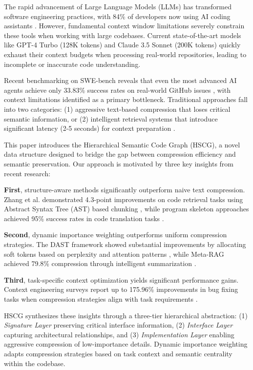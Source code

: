\documentclass[conference]{IEEEtran}
\begin{document}
The rapid advancement of Large Language Models (LLMs) has transformed software engineering practices, with 84\% of developers now using AI coding assistants \cite{stackoverflow2025survey}. However, fundamental context window limitations severely constrain these tools when working with large codebases. Current state-of-the-art models like GPT-4 Turbo (128K tokens) and Claude 3.5 Sonnet (200K tokens) quickly exhaust their context budgets when processing real-world repositories, leading to incomplete or inaccurate code understanding.

Recent benchmarking on SWE-bench reveals that even the most advanced AI agents achieve only 33.83\% success rates on real-world GitHub issues \cite{swebench2024}, with context limitations identified as a primary bottleneck. Traditional approaches fall into two categories: (1) aggressive text-based compression that loses critical semantic information, or (2) intelligent retrieval systems that introduce significant latency (2-5 seconds) for context preparation \cite{cognition2024swebench}.

This paper introduces the Hierarchical Semantic Code Graph (HSCG), a novel data structure designed to bridge the gap between compression efficiency and semantic preservation. Our approach is motivated by three key insights from recent research:

\textbf{First}, structure-aware methods significantly outperform naive text compression. Zhang et al. demonstrated 4.3-point improvements on code retrieval tasks using Abstract Syntax Tree (AST) based chunking \cite{zhang2024cast}, while program skeleton approaches achieved 95\% success rates in code translation tasks \cite{aleithan2024programskeletons}.

\textbf{Second}, dynamic importance weighting outperforms uniform compression strategies. The DAST framework showed substantial improvements by allocating soft tokens based on perplexity and attention patterns \cite{liu2025dast}, while Meta-RAG achieved 79.8\% compression through intelligent summarization \cite{tawosi2024metarag}.

\textbf{Third}, task-specific context optimization yields significant performance gains. Context engineering surveys report up to 175.96\% improvements in bug fixing tasks when compression strategies align with task requirements \cite{kumar2024contextengineering}.

HSCG synthesizes these insights through a three-tier hierarchical abstraction: (1) \textit{Signature Layer} preserving critical interface information, (2) \textit{Interface Layer} capturing architectural relationships, and (3) \textit{Implementation Layer} enabling aggressive compression of low-importance details. Dynamic importance weighting adapts compression strategies based on task context and semantic centrality within the codebase.
\end{document}
